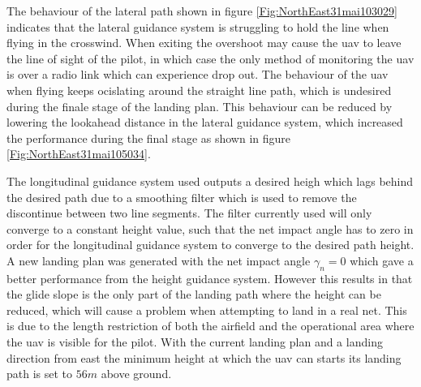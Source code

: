 The behaviour of the lateral path shown in figure \ref{Fig:NorthEast31mai103029} indicates that the lateral guidance system is struggling to hold the line when flying in the crosswind. When exiting the overshoot may cause the \gls{uav} to leave the line of sight of the pilot, in which case the only method of monitoring the \gls{uav} is over a radio link which can experience drop out. The behaviour of the \gls{uav} when flying keeps ocislating around the straight line path, which is undesired during the finale stage of the landing plan. This behaviour can be reduced by lowering the lookahead distance in the lateral guidance system, which increased the performance during the final stage as shown in figure \ref{Fig:NorthEast31mai105034}.  

The longitudinal guidance system used outputs a desired heigh which lags behind the desired path due to a smoothing filter which is used to remove the discontinue between two line segments. The filter currently used will only converge to a constant height value, such that the net impact angle has to zero in order for the longitudinal guidance system to converge to the desired path height. A new landing plan was generated with the net impact angle $\gamma_n = 0$ which gave a better performance from the height guidance system. However this results in that the glide slope is the only part of the landing path where the height can be reduced, which will cause a problem when attempting to land in a real net. This is due to the length restriction of both the airfield and the operational area where the \gls{uav} is visible for the pilot. With the current landing plan and a landing direction from east the minimum height at which the \gls{uav} can starts its landing path is set to $56 m$ above ground. 
\newpage

